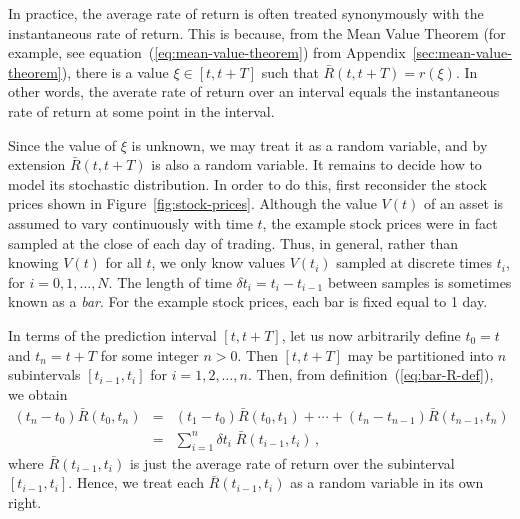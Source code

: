 \documentclass[a4paper]{article}
\begin{document}
In practice, the average rate of return
is often treated synonymously with the instantaneous
rate of return. This is because, 
from the Mean Value Theorem 
(for example, see equation~(\ref{eq:mean-value-theorem}) from Appendix~\ref{sec:mean-value-theorem}),
there is a value $\xi\in[t,t+T]$ such that $\bar{R}(t,t+T)=r(\xi)$.
In other words, the averate rate of return over an interval equals the instantaneous rate of return at some point in the interval.

Since the value of $\xi$ is unknown, we may treat it as a random variable,
and by extension $\bar{R}(t,t+T)$ is also a random variable.
It remains to decide how to model
its stochastic distribution.
In order to do this, first reconsider
the stock prices shown in Figure~\ref{fig:stock-prices}.
Although the value $V(t)$ of an asset is assumed to vary continuously with time $t$, the example stock prices were in
fact sampled at the close of each day of trading.
Thus, in general, rather than knowing $V(t)$ for all $t$, we only know
values $V(t_i)$ sampled at discrete times $t_i$,
for $i=0,1,\ldots,N$. The length of time $\delta t_i=t_i-t_{i-1}$ 
between samples is sometimes known as a {\em bar}.
For the example stock prices, each bar is fixed equal to 1 day.

In terms of the prediction interval $[t,t+T]$, let us now arbitrarily
define $t_0=t$ and $t_n=t+T$ for some integer $n>0$.
Then $[t,t+T]$ may be partitioned into $n$ subintervals $[t_{i-1},t_i]$
for $i=1,2,\ldots,n$. Then, from definition~(\ref{eq:bar-R-def}),
we obtain
\begin{eqnarray}
(t_n-t_0)\bar{R}(t_0,t_n) & = & 
(t_1-t_0)\bar{R}(t_0,t_1)+\cdots
+(t_n-t_{n-1})\bar{R}(t_{n-1},t_n)\nonumber\\
& = & 
\sum_{i=1}^n \delta t_i\;\bar{R}(t_{i-1},t_i)\,,
\label{eq:R-bar-partition}
\end{eqnarray}
where $\bar{R}(t_{i-1},t_i)$ is just the average rate of return
over the subinterval $[t_{i-1},t_i]$. Hence,
we treat each $\bar{R}(t_{i-1},t_i)$ as a random variable
in its own right. 
\end{document}
